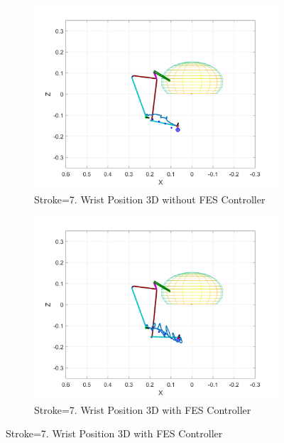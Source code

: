 \begin{landscape}
\begin{figure}[ht]
        \begin{subfigure}[b]{0.33\textwidth}
            \centering
            \includegraphics[width=\linewidth]{Pictures/Results/Controller/Stroke7/20_wp_nofes.png}
            \caption{Stroke=7. Wrist Position 3D without FES Controller}
        \end{subfigure}%
        \hfill
        \begin{subfigure}[b]{0.33\textwidth}
            \centering
            \includegraphics[width=\linewidth]{Pictures/Results/Controller/Stroke7/20_wp_fes.png}
            \caption{Stroke=7. Wrist Position 3D with FES Controller}
        \end{subfigure}
        \hfill

\end{figure}
\end{landscape}
